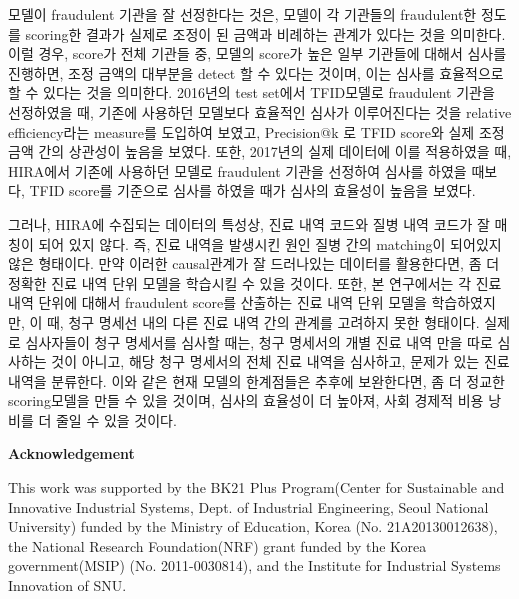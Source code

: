 \documentclass[11pt]{article}           %
\begin{document}
모델이 fraudulent 기관을 잘 선정한다는 것은, 모델이 각 기관들의 fraudulent한 정도를 scoring한 결과가 실제로 조정이 된 금액과 비례하는 관계가 있다는 것을 의미한다.
이럴 경우, score가 전체 기관들 중, 모델의 score가 높은 일부 기관들에 대해서 심사를 진행하면, 조정 금액의 대부분을 detect 할 수 있다는 것이며, 이는 심사를 효율적으로 할 수 있다는 것을 의미한다.
2016년의 test set에서 TFID모델로 fraudulent 기관을 선정하였을 때, 기존에 사용하던 모델보다 효율적인 심사가 이루어진다는 것을 relative efficiency라는 measure를 도입하여 보였고, Precision@k 로 TFID score와 실제 조정 금액 간의 상관성이 높음을 보였다.
또한, 2017년의 실제 데이터에 이를 적용하였을 때, HIRA에서 기존에 사용하던 모델로 fraudulent 기관을 선정하여 심사를 하였을 때보다, TFID score를 기준으로 심사를 하였을 때가 심사의 효율성이 높음을 보였다.

그러나, HIRA에 수집되는 데이터의 특성상, 진료 내역 코드와 질병 내역 코드가 잘 매칭이 되어 있지 않다.
즉, 진료 내역을 발생시킨 원인 질병 간의 matching이 되어있지 않은 형태이다.
만약 이러한 causal관계가 잘 드러나있는 데이터를 활용한다면, 좀 더 정확한 진료 내역 단위 모델을 학습시킬 수 있을 것이다.
또한, 본 연구에서는 각 진료 내역 단위에 대해서 fraudulent score를 산출하는 진료 내역 단위 모델을 학습하였지만, 이 때, 청구 명세선 내의 다른 진료 내역 간의 관계를 고려하지 못한 형태이다.
실제로 심사자들이 청구 명세서를 심사할 때는, 청구 명세서의 개별 진료 내역 만을 따로 심사하는 것이 아니고, 해당 청구 명세서의 전체 진료 내역을 심사하고, 문제가 있는 진료 내역을 분류한다.
이와 같은 현재 모델의 한계점들은 추후에 보완한다면, 좀 더 정교한 scoring모델을 만들 수 있을 것이며, 심사의 효율성이 더 높아져, 사회 경제적 비용 낭비를 더 줄일 수 있을 것이다.

\bigskip
\textbf{Acknowledgement}

This work was supported by the BK21 Plus Program(Center for Sustainable and Innovative Industrial Systems, Dept. of Industrial Engineering, Seoul National University) funded by the Ministry of Education, Korea (No. 21A20130012638), the National Research Foundation(NRF) grant funded by the Korea government(MSIP) (No. 2011-0030814), and the Institute for Industrial Systems Innovation of SNU.



\end{document}

